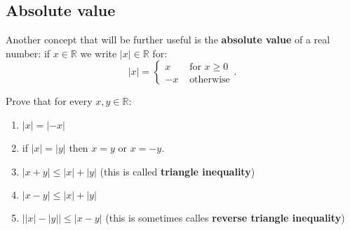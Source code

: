 \subsection{Absolute value}

Another concept that will be further useful is the \textbf{absolute value} of a real number:
if $x\in \mathbb R$ we write $|x|\in \mathbb R$ for:
$$|x| = \begin{cases}x &\text{ for } x \ge 0\\ -x &\text{ otherwise} \end{cases}.$$

\begin{prob}
  Prove that for every $x,y\in \mathbb R$:
  \begin{enumerate}
    \item $|x|=|-x|$
    \item if $|x|=|y|$ then $x=y$ or $x=-y$.
    \item $|x+y| \le |x| + |y|$ (this is called \textbf{triangle inequality})
    \item $|x-y|\le |x| + |y|$
    \item $\left||x| - |y|\right|\le |x-y|$ (this is sometimes calles \textbf{reverse triangle inequality})
  \end{enumerate}

\end{prob}

